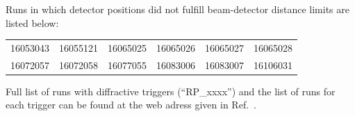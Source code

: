 Runs in which detector positions did not fulfill beam-detector distance limits are listed below:%
%
\begin{center}
\begin{tabular}{llllll}
16053043 & 16055121 & 16065025 & 16065026 & 16065027 & 16065028\\
16072057 & 16072058 & 16077055 & 16083006 & 16083007 & 16106031\\
\end{tabular}
\end{center}%
%
Full list of runs with diffractive triggers (``RP\_xxxx'') and the list of runs for each trigger can be found at the web adress given in Ref.~\cite{onlineRpTriggersMonitoring}.